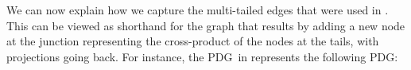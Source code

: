 \documentclass{article}
\newcommand{\MN}{PDG}
\numberwithin{equation}{section}
\begin{document}
	We can now explain how we capture the multi-tailed edges that were used in 
	.
%
This can be viewed as shorthand for the graph that results by
adding a new
node at the junction representing the cross-product of the 
nodes at the tails, with projections going back.  For
instance,  the \MN\ in 
represents the following PDG:
\end{document}

